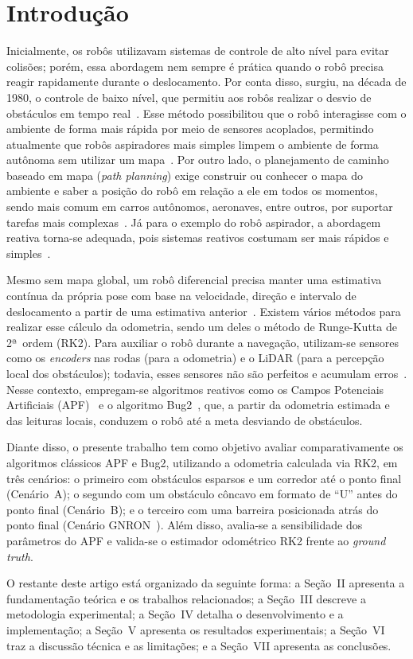 \section{Introdução}

Inicialmente, os robôs utilizavam sistemas de controle de alto nível para
evitar colisões; porém, essa abordagem nem sempre é prática quando o robô
precisa reagir rapidamente durante o deslocamento. Por conta disso,      
surgiu, na década de 1980, o controle de baixo nível, que permitiu aos   
robôs realizar o desvio de obstáculos em tempo real~\cite{khatib1986}.   
Esse método possibilitou que o robô interagisse com o ambiente de forma  
mais rápida por meio de sensores acoplados, permitindo atualmente que    
robôs aspiradores mais simples limpem o ambiente de forma autônoma sem   
utilizar um mapa~\cite{corke2023}. Por outro lado, o planejamento de     
caminho baseado em mapa (\textit{path planning}) exige construir ou      
conhecer o mapa do ambiente e saber a posição do robô em relação a ele em
todos os momentos, sendo mais comum em carros autônomos, aeronaves, entre
outros, por suportar tarefas mais complexas~\cite{corke2023}. Já para o  
exemplo do robô aspirador, a abordagem reativa torna-se adequada, pois   
sistemas reativos costumam ser mais rápidos e simples~\cite{corke2023}.  

Mesmo sem mapa global, um robô diferencial precisa manter uma estimativa 
contínua da própria pose com base na velocidade, direção e intervalo de  
deslocamento a partir de uma estimativa anterior~\cite{corke2023}.       
Existem vários métodos para realizar esse cálculo da odometria, sendo um 
deles o método de Runge-Kutta de 2ª~ordem (RK2). Para auxiliar o robô    
durante a navegação, utilizam-se sensores como os \textit{encoders} nas  
rodas (para a odometria) e o LiDAR (para a percepção local dos           
obstáculos); todavia, esses sensores não são perfeitos e acumulam        
erros~\cite{siegwart2004,corke2023}. Nesse contexto, empregam-se         
algoritmos reativos como os Campos Potenciais Artificiais
(APF)~\cite{khatib1986} e o algoritmo Bug2~\cite{lumelsky1987}, que, a   
partir da odometria estimada e das leituras locais, conduzem o robô até a
meta desviando de obstáculos.

Diante disso, o presente trabalho tem como objetivo avaliar
comparativamente os algoritmos clássicos APF e Bug2, utilizando a        
odometria calculada via RK2, em três cenários: o primeiro com obstáculos 
esparsos e um corredor até o ponto final (Cenário~A); o segundo com um   
obstáculo côncavo em formato de ``U'' antes do ponto final (Cenário~B); e
o terceiro com uma barreira posicionada atrás do ponto final (Cenário 
GNRON~\cite{ge2000}). Além disso, avalia-se a sensibilidade dos parâmetros do APF e    
valida-se o estimador odométrico RK2 frente ao \textit{ground truth}.

O restante deste artigo está organizado da seguinte forma: a Seção~II  
apresenta a fundamentação teórica e os trabalhos relacionados; a     
Seção~III descreve a metodologia experimental; a Seção~IV detalha o     
desenvolvimento e a implementação; a Seção~V apresenta os resultados
experimentais; a Seção~VI traz a discussão técnica e as limitações; e a 
Seção~VII apresenta as conclusões. 
